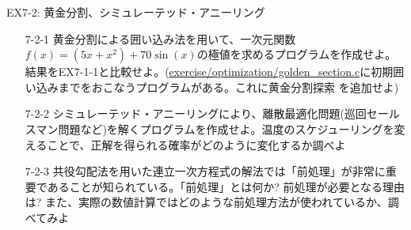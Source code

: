\documentclass[dvipdfmx]{beamer}
\begin{document}
\begin{frame}[t,fragile]{EX7-2: 黄金分割、シミュレーテッド・アニーリング}
  \begin{itemize}
  \item[7-2-1] 黄金分割による囲い込み法を用いて、一次元関数$f(x)=(5x+x^2)+70\sin(x)$の極値を求めるプログラムを作成せよ。結果をEX7-1-1と比較せよ。(\href{https://github.com/todo-group/computer-experiments/exercise/optimization/golden_section.c}{exercise/optimization/golden\_section.c}に初期囲い込みまでをおこなうプログラムがある。これに黄金分割探索
を追加せよ)
  \item[7-2-2] シミュレーテッド・アニーリングにより、離散最適化問題(巡回セールスマン問題など)を解くプログラムを作成せよ。温度のスケジューリングを変えることで、正解を得られる確率がどのように変化するか調べよ
  \item[7-2-3] 共役勾配法を用いた連立一次方程式の解法では「前処理」が非常に重要であることが知られている。「前処理」とは何か? 前処理が必要となる理由は? また、実際の数値計算ではどのような前処理方法が使われているか、調べてみよ
  \end{itemize}
\end{frame}
\end{document}
